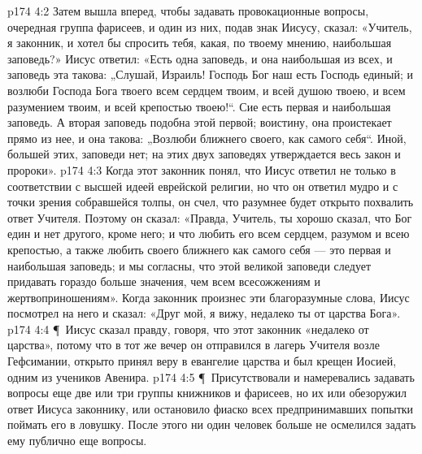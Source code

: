 \vs p174 4:2 Затем вышла вперед, чтобы задавать провокационные вопросы, очередная группа фарисеев, и один из них, подав знак Иисусу, сказал: «Учитель, я законник, и хотел бы спросить тебя, какая, по твоему мнению, наибольшая заповедь?» Иисус ответил: «Есть одна заповедь, и она наибольшая из всех, и заповедь эта такова: „Слушай, Израиль! Господь Бог наш есть Господь единый; и возлюби Господа Бога твоего всем сердцем твоим, и всей душою твоею, и всем разумением твоим, и всей крепостью твоею!“. Сие есть первая и наибольшая заповедь. А вторая заповедь подобна этой первой; воистину, она проистекает прямо из нее, и она такова: „Возлюби ближнего своего, как самого себя“. Иной, большей этих, заповеди нет; на этих двух заповедях утверждается весь закон и пророки».
\vs p174 4:3 Когда этот законник понял, что Иисус ответил не только в соответствии с высшей идеей еврейской религии, но что он ответил мудро и с точки зрения собравшейся толпы, он счел, что разумнее будет открыто похвалить ответ Учителя. Поэтому он сказал: «Правда, Учитель, ты хорошо сказал, что Бог един и нет другого, кроме него; и что любить его всем сердцем, разумом и всею крепостью, а также любить своего ближнего как самого себя --- это первая и наибольшая заповедь; и мы согласны, что этой великой заповеди следует придавать гораздо больше значения, чем всем всесожжениям и жертвоприношениям». Когда законник произнес эти благоразумные слова, Иисус посмотрел на него и сказал: «Друг мой, я вижу, недалеко ты от царства Бога».
\vs p174 4:4 \P\ Иисус сказал правду, говоря, что этот законник «недалеко от царства», потому что в тот же вечер он отправился в лагерь Учителя возле Гефсимании, открыто принял веру в евангелие царства и был крещен Иосией, одним из учеников Авенира.
\vs p174 4:5 \P\ Присутствовали и намеревались задавать вопросы еще две или три группы книжников и фарисеев, но их или обезоружил ответ Иисуса законнику, или остановило фиаско всех предпринимавших попытки поймать его в ловушку. После этого ни один человек больше не осмелился задать ему публично еще вопросы.
